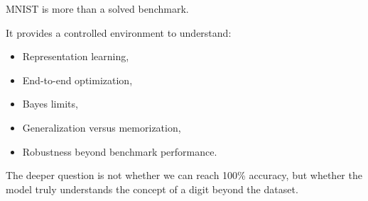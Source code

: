\documentclass[11pt]{article}
\begin{document}
MNIST is more than a solved benchmark.

It provides a controlled environment to understand:

\begin{itemize}
    \item Representation learning,
    \item End-to-end optimization,
    \item Bayes limits,
    \item Generalization versus memorization,
    \item Robustness beyond benchmark performance.
\end{itemize}

The deeper question is not whether we can reach 100\% accuracy, but whether the model truly understands the concept of a digit beyond the dataset.
\end{document}
